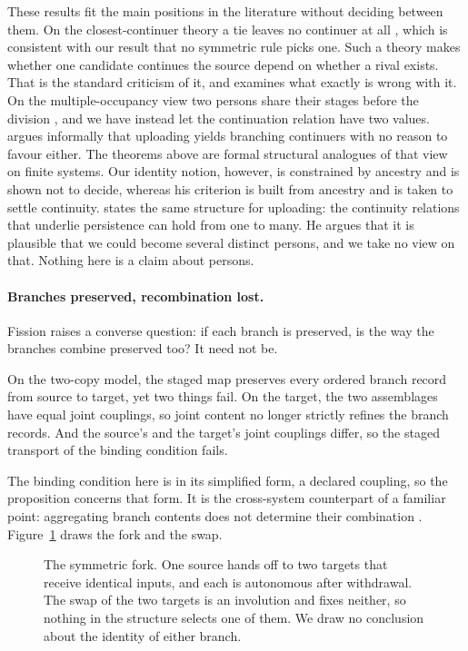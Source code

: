 These results fit the main positions in the literature without deciding
between them. On the closest-continuer theory a tie leaves no continuer at all
\citep{Nozick1981}, which is consistent with our result that no symmetric rule
picks one. Such a theory makes whether one candidate continues the source
depend on whether a rival exists. That is the standard criticism of it, and
\citet{Hawley2005} examines what exactly is wrong with it. On the multiple-occupancy view two persons share their stages
before the division \citep{Lewis1976}, and we have instead let the
continuation relation have two values. \citet{Cerullo2015} argues informally
that uploading yields branching continuers with no reason to favour either. The
theorems above are formal structural analogues of that view on finite systems.
Our identity notion, however, is constrained by ancestry and is shown not to
decide, whereas his criterion is built from ancestry and is taken to settle
continuity. \citet{Weber2025Multiplicity} states the same structure for
uploading: the continuity relations that underlie persistence can hold from
one to many. He argues that it is plausible that we could become several distinct
persons, and we take no view on that. Nothing here is a claim about persons.

\paragraph{Branches preserved, recombination lost.}
Fission raises a converse question: if each branch is preserved, is the way the
branches combine preserved too? It need not be.

\begin{proposition}
\label{prop:recombination}
On the two-copy model, the staged map preserves every ordered branch record
from source to target, yet two things fail. On the target, the two assemblages
have equal joint couplings, so joint content no longer strictly refines the
branch records. And the source's and the target's joint couplings differ, so
the staged transport of the binding condition fails.
\end{proposition}

The binding condition here is in its simplified form, a declared coupling, so
the proposition concerns that form. It is the cross-system counterpart of a
familiar point: aggregating branch contents does not determine their
combination \citep{TsiokosArchitecture2026}. Figure~\ref{fig:fork} draws the
fork and the swap.

\begin{figure}[tbp]
\centering

\caption{The symmetric fork. One source hands off to two targets that receive identical inputs, and each is autonomous after withdrawal. The swap of the two targets is an involution and fixes neither, so nothing in the structure selects one of them. We draw no conclusion about the identity of either branch.}
\label{fig:fork}
\end{figure}
